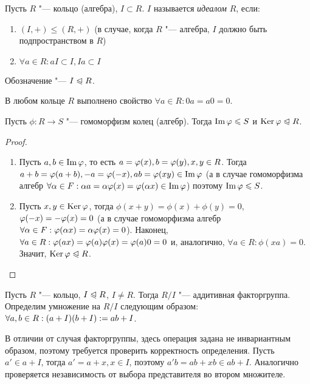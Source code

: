 \begin{definition}
	Пусть $R$ "--- кольцо (алгебра), $I \subset R$. $I$ называется \textit{идеалом} $R$, если:
	\begin{enumerate}
		\item $(I, +) \le (R, +)$ (в случае, когда $R$ "--- алгебра, $I$ должно быть подпространством в $R$)
		\item $\forall a \in R: aI \subset I, Ia \subset I$
	\end{enumerate}
	
	Обозначение "--- $I \trianglelefteqslant R$.
\end{definition}

\begin{reminder}
	В любом кольце $R$ выполнено свойство $\forall a \in R: 0a = a0 = 0$.
\end{reminder}

\begin{proposition}
	Пусть $\phi: R \to S$ "--- гомоморфизм колец (алгебр). Тогда $\operatorname{Im}\varphi \leqslant S$ и $\operatorname{Ker}\varphi \trianglelefteqslant R$.
\end{proposition}

\begin{proof}~
	\begin{enumerate}
		\item Пусть $a, b \in \operatorname{Im}\varphi$, то есть $a = \phi(x), b = \phi(y), x, y \hm\in R$. Тогда $a + b = \phi(a + b), -a \hm= \phi(-x), ab = \phi(xy) \in \im\phi$ (а в случае гомоморфизма алгебр $\forall \alpha \in F: \alpha a = \alpha\phi(x) \hm= \phi(\alpha x) \in \im\phi$) поэтому $\operatorname{Im}\varphi \leqslant S$.
		\item Пусть $x, y \in \operatorname{Ker}\varphi$, тогда $\phi(x + y) = \phi(x) + \phi(y) = 0$, $\phi(-x) \hm= -\phi(x) = 0$ (а в случае гомоморфизма алгебр $\forall \alpha \in F: \phi(\alpha x) \hm= \alpha\phi(x) = 0$). Наконец, $\forall a \in R: \phi(ax) \hm= \phi(a)\phi(x) \hm= \phi(a)0 = 0$ и, аналогично, $\forall a \in R: \phi(xa) = 0$. Значит, $\operatorname{Ker}\varphi \trianglelefteqslant R$.
	\end{enumerate}
\end{proof}

\begin{definition}
	Пусть $R$ "--- кольцо, $I \trianglelefteqslant R$, $I \ne R$. Тогда $R / I$ "--- аддитивная факторгруппа. Определим умножение на $R / I$ следующим образом: $\forall a, b \in R: (a + I)(b + I) \hm{:=} ab + I$.
\end{definition}

\begin{note}
	В отличии от случая факторгруппы, здесь операция задана не инвариантным образом, поэтому требуется проверить корректность определения. Пусть $a' \in a + I$, тогда $a' = a + x, x \in I$, поэтому $a'b = ab + xb \in ab + I$. Аналогично проверяется независимость от выбора представителя во втором множителе.
\end{note}


